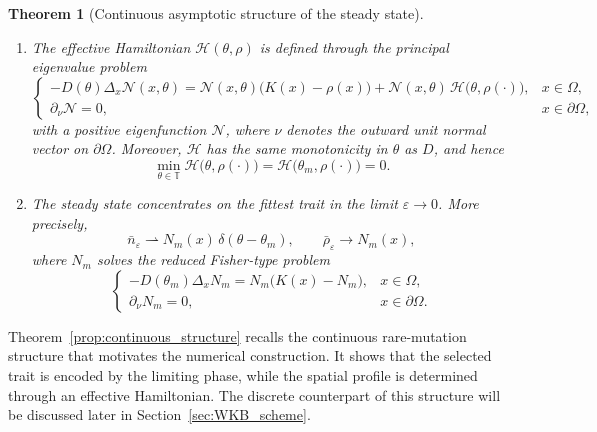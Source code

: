 \documentclass[11pt]{article}
\numberwithin{equation}{section}
\newtheorem{theorem}{Theorem}[section]
\begin{document}
\begin{theorem}[Continuous asymptotic structure of the steady state]
\begin{enumerate}
\item The effective Hamiltonian \(\mathcal H(\theta,\rho)\) is defined through the principal eigenvalue problem
\begin{equation}\label{eq:eigen_N}
\begin{cases}
-D(\theta)\Delta_x \mathcal N(x,\theta)
= \mathcal N(x,\theta)\bigl(K(x)-\rho(x)\bigr)
+ \mathcal N(x,\theta)\,\mathcal H\bigl(\theta,\rho(\cdot)\bigr), & x\in\Omega,\\
\partial_\nu \mathcal N = 0, & x\in\partial\Omega,
\end{cases}
\end{equation}
with a positive eigenfunction \(\mathcal N\), where $\nu$ denotes the outward unit normal  vector on $\partial \Omega$. Moreover, \(\mathcal H\) has the same monotonicity in \(\theta\) as \(D\), and hence
\begin{equation}\label{eq:H_min_zero}
\min_{\theta\in\mathbb T} \mathcal H\bigl(\theta,\rho(\cdot)\bigr)
=
\mathcal H\bigl(\theta_m,\rho(\cdot)\bigr)
=0.
\end{equation}

\item The steady state concentrates on the fittest trait in the limit \(\varepsilon\to0\). More precisely,
\begin{equation}\label{eq:continuous_dirac_limit}
\bar n_\varepsilon \rightharpoonup N_m(x)\,\delta(\theta-\theta_m),
\qquad
\bar\rho_\varepsilon \to N_m(x),
\end{equation}
where \(N_m\) solves the reduced Fisher-type problem
\begin{equation}\label{eq:Nm_problem}
\begin{cases}
-D(\theta_m)\Delta_x N_m = N_m\bigl(K(x)-N_m\bigr), & x\in\Omega,\\
\partial_\nu N_m = 0, & x\in\partial\Omega.
\end{cases}
\end{equation}
\end{enumerate}
\end{theorem}


Theorem~\ref{prop:continuous_structure} recalls the continuous
rare-mutation structure that motivates the numerical construction.  It
shows that the selected trait is encoded by the limiting phase, while the
spatial profile is determined through an effective Hamiltonian. 
The discrete counterpart of this structure will be discussed later in Section~\ref{sec:WKB_scheme}.




\end{document}

